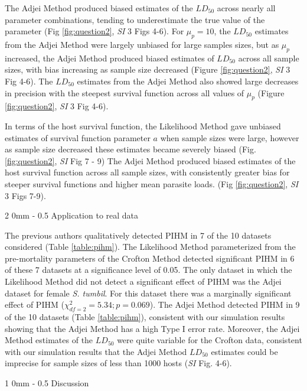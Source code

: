 \documentclass[12pt, a4paper]{article}
\makeatletter
\renewcommand{\section}{\@startsection
{section}%
{1}%
{0mm}%
{-\baselineskip}%
{0.5\baselineskip}%
{\normalfont\bf\large}} %
\renewcommand{\subsection}{\@startsection
{subsection}%
{2}%
{0mm}%
{-\baselineskip}%
{0.5\baselineskip}%
{\normalfont\bf}} %
\makeatother
\begin{document}
The Adjei Method produced biased estimates of the $LD_{50}$ across nearly all parameter combinations, tending to underestimate the true value of the parameter (Fig \ref{fig:question2}, \emph{SI} 3 Figs 4-6).  For $\mu_p = 10$, the $LD_{50}$
estimates from the Adjei Method were largely unbiased for large samples sizes, but as $\mu_p$ increased, the Adjei Method
produced biased estimates of $LD_{50}$ across all sample sizes, with bias
increasing as sample size decreased (Figure \ref{fig:question2}, \emph{SI} 3 Fig 4-6). The $LD_{50}$ estimates from the Adjei
Method also showed large decreases in precision with the steepest survival function across all values of $\mu_p$ (Figure \ref{fig:question2}, \emph{SI} 3 Fig 4-6).

In terms of the host survival function, the Likelihood Method gave unbiased estimates of survival function parameter $a$ when sample sizes were large, however as sample size decreased these estimates became severely biased (Fig. \ref{fig:question2}, \emph{SI} Fig 7 - 9) The Adjei Method produced
biased estimates of the host survival function across all sample sizes, with consistently greater bias for steeper survival functions and higher mean parasite loads. (Fig \ref{fig:question2}, \emph{SI} 3 Figs 7-9).

\subsection{Application to real data}

The previous authors qualitatively detected PIHM
in 7 of the 10 datasets considered (Table \ref{table:pihm}).  The Likelihood Method parameterized
from the pre-mortality parameters of the Crofton Method detected significant
PIHM in 6 of these 7 datasets at a significance level of 0.05.  The only
dataset in which the Likelihood Method did not detect a significant effect of PIHM was the Adjei dataset
for female \emph{S. tumbil}.  For this dataset there was a marginally significant effect
of PIHM ($\chi^2_{df=2} = 5.34; p = 0.069$). The Adjei Method detected PIHM in 9 of the 10 datasets (Table \ref{table:pihm}), consistent with our simulation results showing that the Adjei Method has a high Type I error rate.  Moreover, the Adjei Method estimates of the $LD_{50}$ were quite variable for the Crofton data, consistent with our simulation results that the Adjei Method $LD_{50}$ estimates could be imprecise for sample sizes of less than 1000 hosts (\emph{SI} Fig. 4-6).

\section{Discussion}
\end{document}

